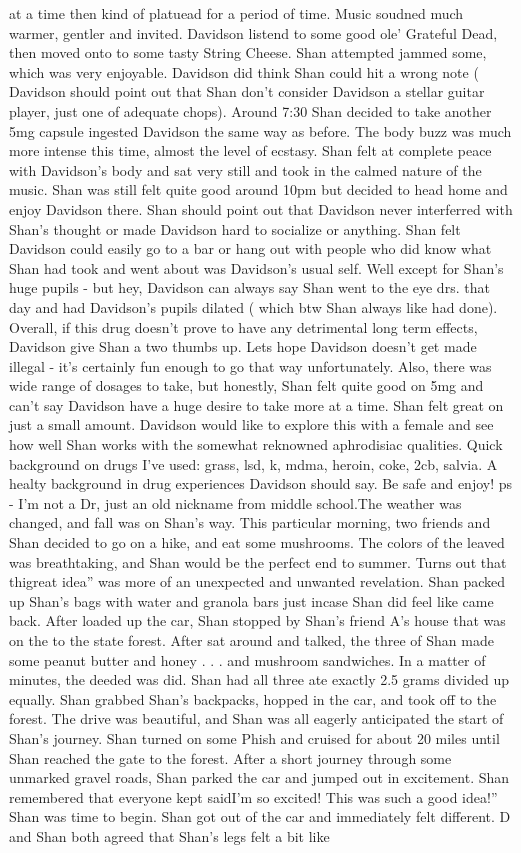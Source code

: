 \documentclass[12pt]{book}
\begin{document}
at a time then kind of platuead for a period of time. Music soudned much warmer, gentler and invited. Davidson listend to some good ole' Grateful Dead, then moved onto to some tasty String Cheese. Shan attempted jammed some, which was very enjoyable. Davidson did think Shan could hit a wrong note ( Davidson should point out that Shan don't consider Davidson a stellar guitar player, just one of adequate chops). Around 7:30 Shan decided to take another 5mg capsule ingested Davidson the same way as before. The body buzz was much more intense this time, almost the level of ecstasy. Shan felt at complete peace with Davidson's body and sat very still and took in the calmed nature of the music. Shan was still felt quite good around 10pm but decided to head home and enjoy Davidson there. Shan should point out that Davidson never interferred with Shan's thought or made Davidson hard to socialize or anything. Shan felt Davidson could easily go to a bar or hang out with people who did know what Shan had took and went about was Davidson's usual self. Well except for Shan's huge pupils - but hey, Davidson can always say Shan went to the eye drs. that day and had Davidson's pupils dilated ( which btw Shan always like had done). Overall, if this drug doesn't prove to have any detrimental long term effects, Davidson give Shan a two thumbs up. Lets hope Davidson doesn't get made illegal - it's certainly fun enough to go that way unfortunately. Also, there was wide range of dosages to take, but honestly, Shan felt quite good on 5mg and can't say Davidson have a huge desire to take more at a time. Shan felt great on just a small amount. Davidson would like to explore this with a female and see how well Shan works with the somewhat reknowned aphrodisiac qualities. Quick background on drugs I've used: grass, lsd, k, mdma, heroin, coke, 2cb, salvia. A healty background in drug experiences Davidson should say. Be safe and enjoy! ps - I'm not a Dr, just an old nickname from middle school.The weather was changed, and fall was on Shan's way. This particular morning, two friends and Shan decided to go on a hike, and eat some mushrooms. The colors of the leaved was breathtaking, and Shan would be the perfect end to summer. Turns out that thigreat idea'' was more of an unexpected and unwanted revelation. Shan packed up Shan's bags with water and granola bars just incase Shan did feel like came back. After loaded up the car, Shan stopped by Shan's friend A's house that was on the to the state forest. After sat around and talked, the three of Shan made some peanut butter and honey . . .  and mushroom sandwiches. In a matter of minutes, the deeded was did. Shan had all three ate exactly 2.5 grams divided up equally. Shan grabbed Shan's backpacks, hopped in the car, and took off to the forest. The drive was beautiful, and Shan was all eagerly anticipated the start of Shan's journey. Shan turned on some Phish and cruised for about 20 miles until Shan reached the gate to the forest. After a short journey through some unmarked gravel roads, Shan parked the car and jumped out in excitement. Shan remembered that everyone kept saidI'm so excited! This was such a good idea!'' Shan was time to begin. Shan got out of the car and immediately felt different. D and Shan both agreed that Shan's legs felt a bit like 
\end{document}
